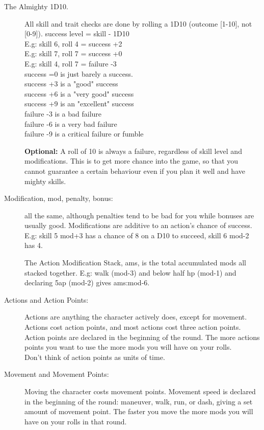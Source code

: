 \begin{description}

\item[The Almighty 1D10.] All skill and trait checks are done by rolling a 1D10 (outcome [1-10], not [0-9]).
success level = skill - 1D10 \\
E.g: skill 6, roll 4 = success +2 \\
E.g: skill 7, roll 7 = success +0 \\
E.g: skill 4, roll 7 = failure -3 \\
success =0 is just barely a success. \\
success +3 is a "good" success \\
success +6 is a "very good" success \\
success +9 is an "excellent" success \\
failure -3 is a bad failure \\
failure -6 is a very bad failure \\
failure -9 is a critical failure or fumble

\textbf{Optional:} A roll of 10 is always a failure, regardless of skill level and modifications. This is to get more chance into the game, so that you cannot guarantee a certain behaviour even if you plan it well and have mighty skills.

\item[Modification, mod, penalty, bonus:] all the same, although penalties tend to be bad for you while bonuses are usually good. Modifications are additive to an action's chance of success. \\
E.g: skill 5 mod+3 has a chance of 8 on a D10 to succeed, skill 6 mod-2 has 4.

The Action Modification Stack, ams, is the total accumulated mods all stacked together. E.g: walk (mod-3) and below half hp (mod-1) and declaring 5ap (mod-2) gives ams:mod-6.

\item[Actions and Action Points:]
Actions are anything the character actively does, except for movement. Actions cost action points, and most actions cost three action points.
Action points are declared in the beginning of the round. The more actions points you want to use the more mods you will have on your rolls.\\
Don't think of action points as units of time.

\item[Movement and Movement Points:]
Moving the character costs movement points. Movement speed is declared in the beginning of the round: maneuver, walk, run, or dash, giving a set amount of movement point. The faster you move the more mods you will have on your rolls in that round.


\end{description}
